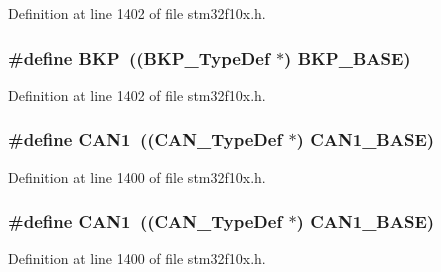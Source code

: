 Definition at line 1402 of file stm32f10x.\+h.

\subsubsection[{\texorpdfstring{B\+KP}{BKP}}]{\setlength{\rightskip}{0pt plus 5cm}\#define B\+KP~(({\bf B\+K\+P\+\_\+\+Type\+Def} $\ast$) {\bf B\+K\+P\+\_\+\+B\+A\+SE})}\hypertarget{group___peripheral__declaration_gaa38716de06974ea948ad34ef7bfee00b}{}\label{group___peripheral__declaration_gaa38716de06974ea948ad34ef7bfee00b}


Definition at line 1402 of file stm32f10x.\+h.

\subsubsection[{\texorpdfstring{C\+A\+N1}{CAN1}}]{\setlength{\rightskip}{0pt plus 5cm}\#define C\+A\+N1~(({\bf C\+A\+N\+\_\+\+Type\+Def} $\ast$) {\bf C\+A\+N1\+\_\+\+B\+A\+SE})}\hypertarget{group___peripheral__declaration_ga4964ecb6a5c689aaf8ee2832b8093aac}{}\label{group___peripheral__declaration_ga4964ecb6a5c689aaf8ee2832b8093aac}


Definition at line 1400 of file stm32f10x.\+h.

\subsubsection[{\texorpdfstring{C\+A\+N1}{CAN1}}]{\setlength{\rightskip}{0pt plus 5cm}\#define C\+A\+N1~(({\bf C\+A\+N\+\_\+\+Type\+Def} $\ast$) {\bf C\+A\+N1\+\_\+\+B\+A\+SE})}\hypertarget{group___peripheral__declaration_ga4964ecb6a5c689aaf8ee2832b8093aac}{}\label{group___peripheral__declaration_ga4964ecb6a5c689aaf8ee2832b8093aac}


Definition at line 1400 of file stm32f10x.\+h.

